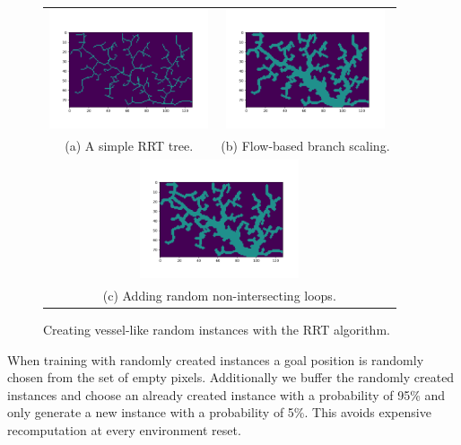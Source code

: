 \begin{figure}[ht]
    \begin{center}
    \begin{tabular}{cc}
    \includegraphics[clip, trim=58 62 45 60, height=3.5cm]{figures/implementation/rrt_base.png} &
    \includegraphics[clip, trim=58 62 45 60, height=3.5cm]{figures/implementation/rrt_base_flow.png} \\
    {\footnotesize (a) A simple RRT tree.} &
    {\footnotesize (b) Flow-based branch scaling.} \\
    \multicolumn{2}{c}{\includegraphics[clip, trim=58 62 45 60, height=3.5cm]{figures/implementation/rrt_base_loops.png}} \\
    \multicolumn{2}{c}{{\footnotesize (c) Adding random non-intersecting loops.}}
    \end{tabular}
    \end{center}
    \caption[Random Instance Generation]{Creating vessel-like random instances with the RRT algorithm.}
    \label{fig:RRTTrees}
  \end{figure}

When training with randomly created instances a goal position is randomly chosen from the set of empty pixels. Additionally we buffer the randomly created instances and choose an already created instance with a probability of 95\% and only generate a new instance with a probability of 5\%. This avoids expensive recomputation at every environment reset.

